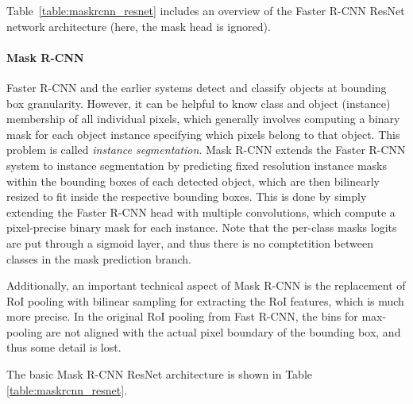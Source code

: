 Table~\ref{table:maskrcnn_resnet} includes an overview of the Faster R-CNN ResNet network architecture
(here, the mask head is ignored).

\paragraph{Mask R-CNN}
Faster R-CNN and the earlier systems detect and classify objects at bounding box granularity.
However, it can be helpful to know class and object (instance) membership of all individual pixels,
which generally involves computing a binary mask for each object instance specifying which pixels belong
to that object. This problem is called \emph{instance segmentation}.
Mask R-CNN \cite{MaskRCNN} extends the Faster R-CNN system to instance segmentation by predicting
fixed resolution instance masks within the bounding boxes of each detected object,
which are then bilinearly resized to fit inside the respective bounding boxes.
This is done by simply extending the Faster R-CNN head with multiple convolutions, which
compute a pixel-precise binary mask for each instance.
Note that the per-class masks logits are put through a sigmoid layer, and thus there is no
comptetition between classes in the mask prediction branch.

Additionally, an important technical aspect of Mask R-CNN is the replacement of RoI pooling with
bilinear sampling for extracting the RoI features, which is much more precise.
In the original RoI pooling from Fast R-CNN, the bins for max-pooling are not aligned with the actual pixel
boundary of the bounding box, and thus some detail is lost.

The basic Mask R-CNN ResNet architecture is shown in Table \ref{table:maskrcnn_resnet}.


